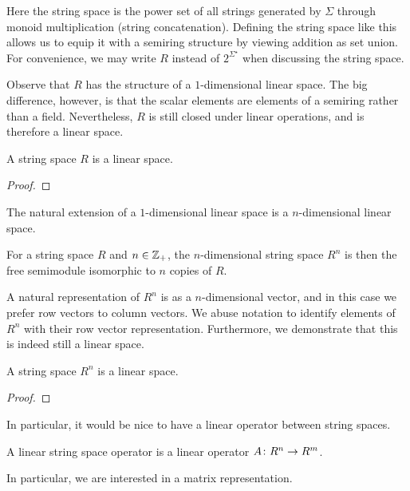 \documentclass[12pt]{article}
\begin{document}
Here the string space is the power set of all strings generated
by \(\Sigma\) through monoid multiplication (string concatenation).
Defining the string space like this allows us to equip it with a semiring
structure by viewing addition as set union.
For convenience, we may write \(R\) instead of \(2^{\Sigma^\star}\)
when discussing the string space.

Observe that \(R\) has the structure of a \(1\)-dimensional linear space.
The big difference, however, is that the scalar elements are
elements of a semiring rather than a field.
Nevertheless, \(R\) is still closed under linear operations,
and is therefore a linear space.

\begin{theorem}
  A string space \(R\) is a linear space.
\end{theorem}
\begin{proof}
\end{proof}

The natural extension of a \(1\)-dimensional linear space
is a \(n\)-dimensional linear space.

\begin{definition}
  For a string space \(R\) and \(n \in \mathbb{Z}_{+}\),
  the \(n\)-dimensional string space \(R^n\) is then the
  free semimodule isomorphic to \(n\) copies of \(R\).
\end{definition}

A natural representation of \(R^n\) is as a \(n\)-dimensional vector,
and in this case we prefer row vectors to column vectors.
We abuse notation to identify elements of \(R^n\) with their
row vector representation.
Furthermore, we demonstrate that this is indeed still a linear space.

\begin{theorem}
  A string space \(R^n\) is a linear space.
\end{theorem}
\begin{proof}
\end{proof}

In particular, it would be nice to have a linear operator
between string spaces.

\begin{definition}
  A linear string space operator
  is a linear operator \(A \colon R^n \to R^m\).
\end{definition}

In particular, we are interested in a matrix representation.
\end{document}
